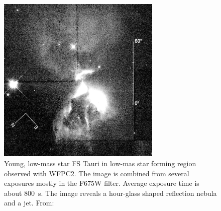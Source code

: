 \documentclass[12pt]{article}
\begin{document}
\begin{figure}
    \centering
    \includegraphics[height=8cm]{Krist98.png}
    \caption{Young, low-mass star FS Tauri in low-mas star forming region observed with WFPC2. The image is combined from several exposures mostly in the F675W filter. Average exposure time is about 800~s. The image reveals a hour-glass shaped reflection nebula and a jet. From: \citet{1998ApJ...501..841K}}
    \label{fig:krist}
\end{figure}
\end{document}
